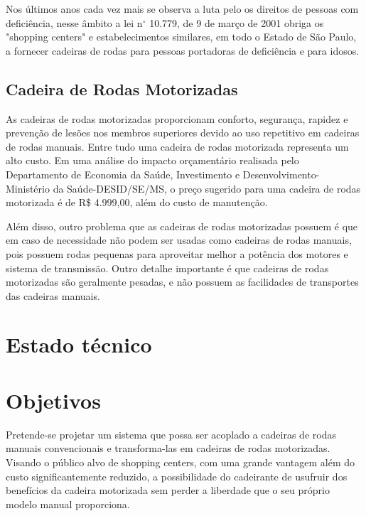Nos últimos anos cada vez mais se observa a luta pelo os direitos de pessoas com deficiência, nesse âmbito a lei n$^{\circ}$ 10.779, de 9 de março de 2001 obriga os "shopping centers" e estabelecimentos similares, em todo o Estado de São Paulo, a fornecer cadeiras de rodas para pessoas portadoras de deficiência e para idosos. 

\subsection{Cadeira de Rodas Motorizadas}

As cadeiras de rodas motorizadas proporcionam conforto, segurança, rapidez e prevenção de lesões nos membros superiores devido ao uso repetitivo em cadeiras de rodas manuais. Entre tudo uma cadeira de rodas motorizada representa um alto custo. Em uma análise do impacto orçamentário realisada pelo Departamento de Economia da Saúde, Investimento e Desenvolvimento- Ministério da Saúde-DESID/SE/MS, o preço sugerido para uma cadeira de rodas motorizada é de R\$ 4.999,00, além do custo de manutenção. \cite{relatorio_sus}

Além disso, outro problema que as cadeiras de rodas motorizadas possuem é que em caso de necessidade não podem ser usadas como cadeiras de rodas manuais, pois possuem rodas pequenas para aproveitar melhor a potência dos motores e sistema de transmissão. Outro detalhe importante é que cadeiras de rodas motorizadas são geralmente pesadas, e não possuem as facilidades de transportes das cadeiras manuais.

\section{Estado técnico}

\section{Objetivos}

Pretende-se projetar um sistema que possa ser acoplado a cadeiras de rodas manuais convencionais e transforma-las em cadeiras de rodas motorizadas. Visando o público alvo de shopping centers, com uma grande vantagem além do custo significantemente reduzido, a possibilidade do cadeirante de usufruir dos benefícios da cadeira motorizada sem perder a liberdade que o seu próprio modelo manual proporciona.
